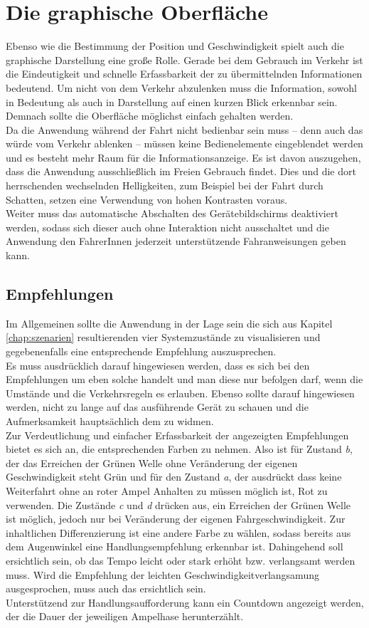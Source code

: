 \section{Die graphische Oberfläche}
Ebenso wie die Bestimmung der Position und Geschwindigkeit spielt auch die graphische Darstellung eine große Rolle. Gerade bei dem Gebrauch im Verkehr ist die Eindeutigkeit und schnelle Erfassbarkeit der zu übermittelnden Informationen bedeutend. Um nicht von dem Verkehr abzulenken muss die Information, sowohl in Bedeutung als auch in Darstellung auf einen kurzen Blick erkennbar sein. Demnach sollte die Oberfläche möglichst einfach gehalten werden.\\
Da die Anwendung während der Fahrt nicht bedienbar sein muss -- denn auch das würde vom Verkehr ablenken -- müssen keine Bedienelemente eingeblendet werden und es besteht mehr Raum für die Informationsanzeige. 
Es ist davon auszugehen, dass die Anwendung ausschließlich im Freien Gebrauch findet. Dies und die dort herrschenden wechselnden Helligkeiten, zum Beispiel bei der Fahrt durch Schatten, setzen eine Verwendung von hohen Kontrasten voraus.\\ 
Weiter muss das automatische Abschalten des Gerätebildschirms deaktiviert werden, sodass sich dieser auch ohne Interaktion nicht ausschaltet und die Anwendung den FahrerInnen jederzeit unterstützende Fahranweisungen geben kann. 
\subsection{Empfehlungen}
Im Allgemeinen sollte die Anwendung in der Lage sein die sich aus Kapitel \ref{chap:szenarien} resultierenden vier Systemzustände zu visualisieren und gegebenenfalls eine entsprechende Empfehlung auszusprechen.\\
Es muss ausdrücklich darauf hingewiesen werden, dass es sich bei den Empfehlungen um eben solche handelt und man diese nur befolgen darf, wenn die Umstände und die Verkehrsregeln es erlauben. Ebenso sollte darauf hingewiesen werden, nicht zu lange auf das ausführende Gerät zu schauen und die Aufmerksamkeit hauptsächlich dem zu widmen.\\
Zur Verdeutlichung und einfacher Erfassbarkeit der angezeigten Empfehlungen bietet es sich an, die entsprechenden Farben zu nehmen. Also ist für Zustand \textit{b}, der das Erreichen der Grünen Welle ohne Veränderung der eigenen Geschwindigkeit steht Grün und für den Zustand \textit{a}, der ausdrückt dass keine Weiterfahrt ohne an roter Ampel Anhalten zu müssen möglich ist, Rot zu verwenden.
Die Zustände \textit{c} und \textit{d} drücken aus, ein Erreichen der Grünen Welle ist möglich, jedoch nur bei Veränderung der eigenen Fahrgeschwindigkeit. Zur inhaltlichen Differenzierung ist eine andere Farbe zu wählen, sodass bereits aus dem Augenwinkel eine Handlungsempfehlung erkennbar ist. Dahingehend soll ersichtlich sein, ob das Tempo leicht oder stark erhöht bzw. verlangsamt werden muss. Wird die Empfehlung der leichten Geschwindigkeitverlangsamung ausgesprochen, muss auch das ersichtlich sein.\\
Unterstützend zur Handlungsaufforderung kann ein Countdown angezeigt werden, der die Dauer der jeweiligen Ampelhase herunterzählt. 
